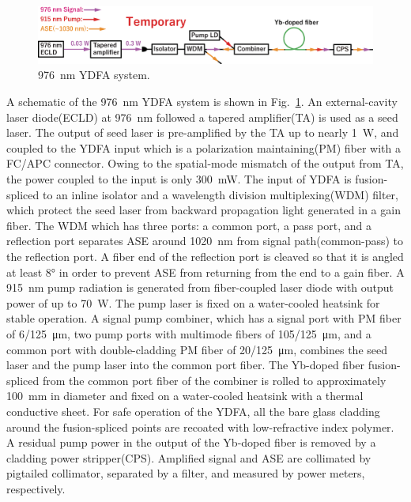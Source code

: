 \documentclass{osa-article}
\begin{document}
\begin{figure}[h!]
  \centering\includegraphics[width=\linewidth]{./Figure/976nmYDFASystem.eps}
  \caption{\SI{976}{\nm} YDFA system.}
  \label{fig:976YDFASystem}
\end{figure}
A schematic of the \SI{976}{\nm} YDFA system is shown in Fig.~\ref{fig:976YDFASystem}.
An external-cavity laser diode(ECLD) at \SI{976}{\nm} followed a tapered amplifier(TA) is used as a seed laser.
The output of seed laser is pre-amplified by the TA up to nearly \SI{1}{\W}, and coupled to the YDFA input which is a polarization maintaining(PM) fiber with a FC/APC connector.
Owing to the spatial-mode mismatch of the output from TA, the power coupled to the input is only \SI{300}{\mW}.
The input of YDFA is fusion-spliced to an inline isolator and a wavelength division multiplexing(WDM) filter, which protect the seed laser from backward propagation light generated in a gain fiber.
The WDM which has three ports: a common port, a pass port, and a reflection port separates ASE around \SI{1020}{\nm} from signal path(common-pass) to the reflection port.
A fiber end of the reflection port is cleaved so that it is angled at least \ang{8} in order to prevent ASE from returning from the end to a gain fiber.
A \SI{915}{\nm} pump radiation is generated from fiber-coupled laser diode with output power of up to \SI{70}{\W}.
The pump laser is fixed on a water-cooled heatsink for stable operation.
A signal pump combiner, which has a signal port with PM fiber of \SI{6/125}{\um}, two pump ports with multimode fibers of \SI{105/125}{\um}, and a common port with double-cladding PM fiber of \SI{20/125}{\um}, combines the seed laser and the pump laser into the common port fiber.
The Yb-doped fiber fusion-spliced from the common port fiber of the combiner is rolled to approximately \SI{100}{\mm} in diameter and fixed on a water-cooled heatsink with a thermal conductive sheet.
For safe operation of the YDFA, all the bare glass cladding around the fusion-spliced points are recoated with low-refractive index polymer.
A residual pump power in the output of the Yb-doped fiber is removed by a cladding power stripper(CPS).
Amplified signal and ASE are collimated by pigtailed collimator, separated by a filter, and measured by power meters, respectively.
\end{document}
